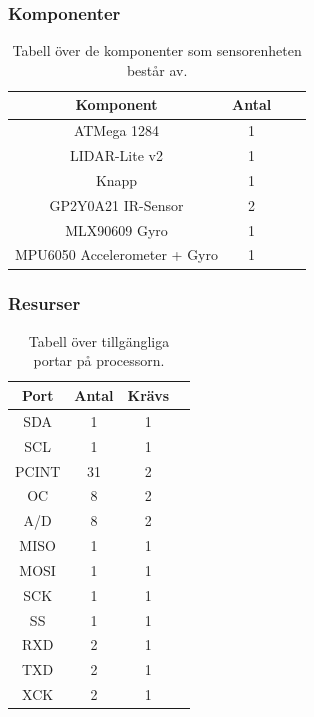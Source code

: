 \documentclass{article}
\begin{document}
\subsubsection{Komponenter}

\begin{table}[H]
  \centering
  \begin{tabular}{ | c | c | c | c |}
    \hline
    \textbf{Komponent} & \textbf{Antal} \\
    \hline
    ATMega 1284 & 1 \\
    \hline
    LIDAR-Lite v2 & 1 \\
    \hline
    Knapp & 1 \\
    \hline
    GP2Y0A21 IR-Sensor & 2 \\
    \hline
    MLX90609 Gyro & 1 \\
    \hline
    MPU6050 Accelerometer + Gyro & 1 \\
    \hline
  \end{tabular}
  \caption{ Tabell över de komponenter som sensorenheten består av. }
\end{table}

\subsubsection{Resurser}

\begin{table}[H]
  \centering
  \begin{tabular}{ | c | c | c | c |}
    \hline
    \textbf{Port} & \textbf{Antal} & \textbf{Krävs} \\
    \hline
    SDA & 1 & 1 \\
    \hline
    SCL & 1 & 1 \\
    \hline
    PCINT & 31 & 2 \\
    \hline
    OC & 8 & 2 \\
    \hline
    A/D & 8 & 2 \\
    \hline
    MISO & 1 & 1 \\
    \hline
    MOSI & 1 & 1 \\
    \hline
    SCK & 1 & 1 \\
    \hline
    SS & 1 & 1 \\
    \hline
    RXD & 2 & 1 \\
    \hline
    TXD & 2 & 1 \\
    \hline
    XCK & 2 & 1 \\
    \hline
  \end{tabular}
  \caption{Tabell över tillgängliga portar på processorn.}
\end{table}
\end{document}
